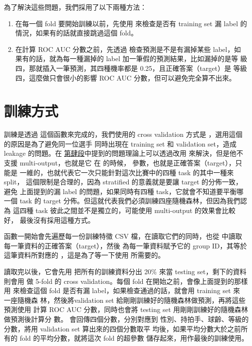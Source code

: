 \documentclass[12pt, a4paper]{article}
\begin{document}
        為了解決這些問題，我們採用了以下兩種方法：
        \begin{enumerate}
            \item 在每一個 fold 要開始訓練以前，先使用
             來檢查是否有 training set
            漏 label 的情況，如果有的話就直接跳過這個 fold。

            \item 在計算 ROC AUC 分數之前，先透過
             檢查預測是不是有漏掉某些 label，如
            果有的話，就為每一種漏掉的 label 加一筆假的預測結果，比如漏掉的是等
            級四，那就插入一筆預測，其四種機率都是 0.25，且正確答案（target）是
            等級四，這麼做只會很小的影響 ROC AUC 分數，但可以避免完全算不出來。
        \end{enumerate}
    \section{訓練方式\label{training-method}}
        訓練是透過  這個函數來完成的，我們使用的 cross
        validation 方式是 ，選用這個的原因是為了避免同一位選手
        同時出現在 training set 和 validation set，造成 leakage 的問題。在%
        \hyperref[data-processing]{第肆段}中提到的問題理論上可以透過改用
         來解決，但是他不支援 multi-output，也就是它
        在  的時候， 參數，也就是正確答案（target），只能是
        一維的，也就代表它一次只能針對這次比賽中的四種 task 的其中一種來 split，
        這個限制是合理的，因為 stratified 的意義就是要讓 target 的分佈一致，避免
        上面提到的漏 label 的問題，如果同時有四種 task，它就會不知道要平衡哪一個
        task 的 target 分佈。但這就代表我們必須訓練四座隨機森林，但因為我們認為
        這四種 task 彼此之間並不是獨立的，可能使用 multi-output 的效果會比較好，
        最後沒有採用這種方式。

        函數一開始會先遍歷每一份訓練特徵 CSV 檔，在讀取它們的同時，也從
         中讀取每一筆資料的正確答案（target），然後
        為每一筆資料賦予它的 group ID，其等於這筆資料所對應的
        ，這是為了等一下使用  所需要的。

        讀取完以後，它會先用  把所有的訓練資料分出 20\%
        來當 testing set，剩下的資料則會用  做 5-fold 的 cross
        validation。每個 fold 在開始之前，會像上面提到的那樣用
         來檢查這個 fold 是否有漏
        label，如果檢查通過的話，就會用 training set 來  一座隨機森
        林，然後將validation set 給剛剛訓練好的隨機森林做預測，再將這些預測使用
         計算 ROC AUC 分數，同時也會將
        testing set 用剛剛訓練好的隨機森林做預測後計算分
        數。 會回傳四個分數，分別對應到
        性別、持拍手、球齡、等級的分數，將用 validation set 算出來的四個分數取平
        均後，如果平均分數大於之前所有的 fold 的平均分數，就將這次 fold 的超參數
        儲存起來，用作最後的訓練使用。
        
\end{document}
